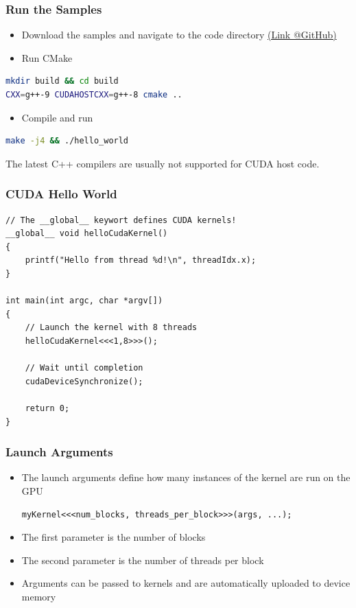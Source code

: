 \documentclass[aspectratio=169]{beamer}
\begin{document}
\begin{frame}[fragile]
\frametitle{Run the Samples}
\begin{itemize}
	\item Download the samples and navigate to the code directory \href{https://github.com/darglein/saiga/tree/master/samples/cuda/helloCuda}{(Link @GitHub)}
	\item Run CMake 
\end{itemize}
\begin{lstlisting}[language=bash]
mkdir build && cd build
CXX=g++-9 CUDAHOSTCXX=g++-8 cmake ..
\end{lstlisting}
\begin{itemize}
	\item Compile and run
\end{itemize}
\begin{lstlisting}[language=bash]
make -j4 && ./hello_world
\end{lstlisting}

\begin{mdframed}[frametitle=Note:]
	The latest C++ compilers are usually not supported for CUDA host code.
\end{mdframed}
	
\end{frame}

\begin{frame}[fragile]
\frametitle{CUDA Hello World}
\begin{lstlisting}
// The __global__ keywort defines CUDA kernels!
__global__ void helloCudaKernel()
{
	printf("Hello from thread %d!\n", threadIdx.x);
}

int main(int argc, char *argv[])
{
	// Launch the kernel with 8 threads
	helloCudaKernel<<<1,8>>>();
	
	// Wait until completion
	cudaDeviceSynchronize();
	
	return 0;
}
\end{lstlisting}
\end{frame}



\begin{frame}[fragile]
	\frametitle{Launch Arguments}
	\begin{itemize}
		\item The launch arguments define how many instances of the kernel are run on the GPU
\begin{lstlisting}
myKernel<<<num_blocks, threads_per_block>>>(args, ...);
\end{lstlisting}
		\item The first parameter is the number of blocks
		\item The second parameter is the number of threads per block
		\item Arguments can be passed to kernels and are automatically uploaded to device memory
	\end{itemize}
\end{frame}
\end{document}
